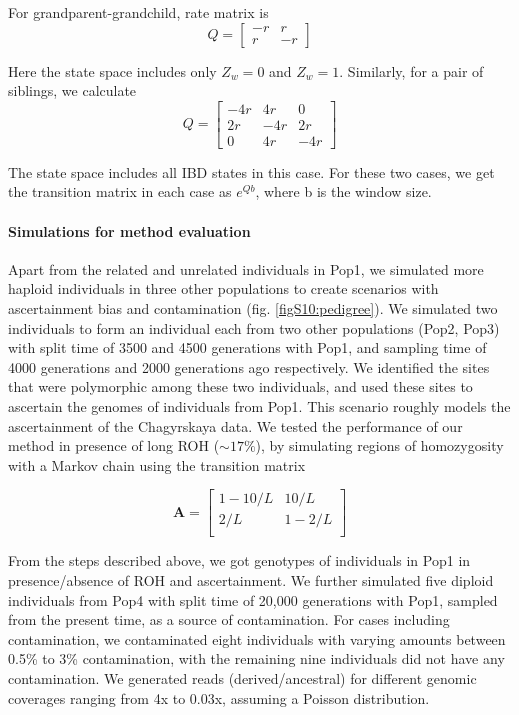 \documentclass[12pt, letterpaper]{article}
\begin{document}
For grandparent-grandchild, rate matrix is
 $$Q = \left[\begin{array}
{rrr}
-r & r \\
r & -r 
\end{array}\right]$$   

Here the state space includes only $Z_w=0$ and $Z_w=1$. 
Similarly, for a pair of siblings, we calculate $$Q =  
\left[\begin{array}
{rrr}
-4r & 4r & 0\\
2r & -4r & 2r\\
0 & 4r & -4r
\end{array}\right]$$   

The state space includes all IBD states in this case. For these two cases, we get the transition matrix in each case as $e^{Qb}$, where b is the window size.


\paragraph{Simulations for method evaluation}
Apart from the related and unrelated individuals in Pop1, we simulated more haploid individuals in three other populations to create scenarios with ascertainment bias and contamination (fig. \ref{figS10:pedigree}). We simulated two individuals to form an individual each from two other populations (Pop2, Pop3) with split time of 3500 and 4500 generations with Pop1, and sampling time of 4000 generations and 2000 generations ago respectively.  We identified the sites that were polymorphic among these two individuals, and used these sites to ascertain the genomes of individuals from Pop1. This scenario roughly models the ascertainment of the Chagyrskaya data. We tested the performance of our method in presence of long ROH ($\sim17\%$), by simulating regions of homozygosity with a Markov chain using the transition matrix

$$\mathbf{A} = \left[\begin{array}
{rr}
1-10/L & 10/L \\
2/L & 1-2/L  \\
\end{array}\right]
$$

From the steps described above, we got genotypes of individuals in Pop1 in presence/absence of ROH and ascertainment. We further simulated five diploid individuals from Pop4 with split time of 20,000 generations with Pop1, sampled from the present time, as a source of contamination.  For cases including contamination, we contaminated eight individuals with varying amounts between 0.5\% to 3\% contamination, with the remaining  nine individuals did not have any contamination. We generated reads (derived/ancestral) for different genomic coverages ranging from 4x to 0.03x, assuming a Poisson distribution.
\end{document}
